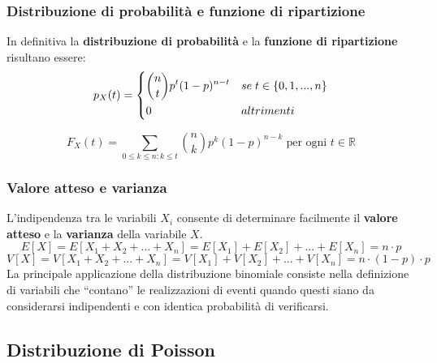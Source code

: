 \subsubsection{Distribuzione di probabilità e funzione di ripartizione}
In definitiva la \textbf{distribuzione di probabilità} e la \textbf{funzione di ripartizione} risultano essere:
\begin{equation}
p_X(t) = 
	\begin{dcases}
		\binom{n}{t} p^t (1 - p)^{n - t} & se \; t \in \{0, 1, ..., n\} \\
		0 & altrimenti
	\end{dcases}
\end{equation}

\begin{equation}
	F_X(t) = \sum_{0 \leq k \leq n: k \leq t} \binom{n}{k}p^k(1-p)^{n-k} \; \text{per ogni } t \in \mathbb{R}
\end{equation}

\subsubsection{Valore atteso e varianza}
L’indipendenza tra le variabili $X_i$ consente di determinare facilmente il \textbf{valore atteso} e la \textbf{varianza} della variabile $X$.
\begin{equation}
	E[X] = E[X_1 + X_2 + ... + X_n] = E[X_1] + E[X_2] + ... + E[X_n] = n \cdot p
\end{equation}
\begin{equation}
	V[X] = V[X_1 + X_2 + ... + X_n] = V[X_1] + V[X_2] + ... + V[X_n] = n \cdot (1-p) \cdot p
\end{equation}
La principale applicazione della distribuzione binomiale consiste nella definizione di variabili che “contano” le realizzazioni di eventi quando questi siano da considerarsi indipendenti e con identica probabilità di verificarsi.

\subsection{Distribuzione di Poisson}
